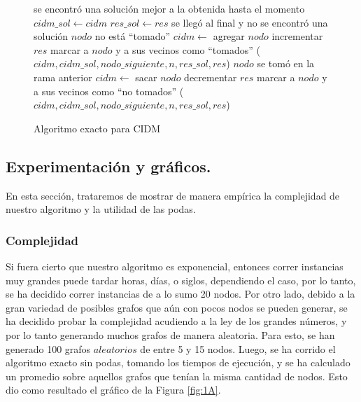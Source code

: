 \begin{figure}
\begin{codebox}
\li \If se encontró una solución mejor a la obtenida hasta el momento
\li \Then 
 		$cidm\_sol \leftarrow cidm$
\li 		$res\_sol \leftarrow res$ 		
\li 		\Return
	\End
\li \If se llegó al final y no se encontró una solución
\li \Then \Return
	\End
\li \If $nodo$ no está ``tomado''	
\li \Then
		$cidm \leftarrow$ agregar $nodo$
\li 		incrementar $res$
\li 		marcar a $nodo$ y a sus vecinos como ``tomados''
($cidm,cidm\_sol,nodo\_siguiente,n,res\_sol,res$)
	\End
\li 	\If $nodo$ se tomó en la rama anterior
\li 	\Then
		$cidm \leftarrow$ sacar $nodo$
\li		decrementar $res$
\li 		marcar a $nodo$ y a sus vecinos como ``no tomados''
	\End
{}($cidm,cidm\_sol,nodo\_siguiente,n,res\_sol,res$)
\end{codebox}
\caption{Algoritmo exacto para CIDM}\label{code:exacto}
\end{figure}

\vspace*{0.6cm}
\subsection{Experimentación y gráficos.}

\vspace*{0.3cm}

En esta sección, trataremos de mostrar de manera empírica la complejidad de nuestro algoritmo y la utilidad de las podas.

\subsubsection{Complejidad}

Si fuera cierto que nuestro algoritmo es exponencial, entonces correr instancias muy grandes puede tardar horas, días, o siglos, dependiendo el caso, por lo tanto, se ha decidido correr instancias de a lo sumo 20 nodos. Por otro lado, debido a la gran variedad de posibles grafos que aún con pocos nodos se pueden generar, se ha decidido probar la complejidad acudiendo a la ley de los grandes números, y por lo tanto generando muchos grafos de manera aleatoria. Para esto, se han generado 100 grafos $aleatorios$ de entre 5 y 15 nodos. Luego, se ha corrido el algoritmo exacto sin podas, tomando los tiempos de ejecución, y se ha calculado un promedio sobre aquellos grafos que tenían la misma cantidad de nodos. Esto dio como resultado el gráfico de la Figura \ref{fig:1A}.

